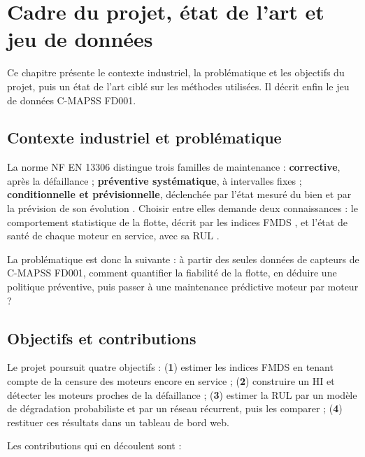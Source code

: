 \chapter{Cadre du projet, état de l'art et jeu de données}\label{sec:cadre}

\chapintro

Ce chapitre présente le contexte industriel, la problématique et les objectifs du projet, puis un état de l'art ciblé sur les méthodes utilisées. Il décrit enfin le jeu de données C-MAPSS FD001.

\section{Contexte industriel et problématique}\label{sec:contexte}

La norme NF EN 13306 \cite{nf13306} distingue trois familles de maintenance : \textbf{corrective}, après la défaillance ; \textbf{préventive systématique}, à intervalles fixes ; \textbf{conditionnelle et prévisionnelle}, déclenchée par l'état mesuré du bien et par la prévision de son évolution \cite{jardine2006}. Choisir entre elles demande deux connaissances : le comportement statistique de la flotte, décrit par les indices FMDS \cite{benhmida}, et l'état de santé de chaque moteur en service, avec sa RUL \cite{lei2018,si2011}.

La problématique est donc la suivante : à partir des seules données de capteurs de C-MAPSS FD001, comment quantifier la fiabilité de la flotte, en déduire une politique préventive, puis passer à une maintenance prédictive moteur par moteur ?

\section{Objectifs et contributions}\label{sec:objectifs}

Le projet poursuit quatre objectifs : (\textbf{1}) estimer les indices FMDS en tenant compte de la censure des moteurs encore en service ; (\textbf{2}) construire un HI et détecter les moteurs proches de la défaillance ; (\textbf{3}) estimer la RUL par un modèle de dégradation probabiliste et par un réseau récurrent, puis les comparer ; (\textbf{4}) restituer ces résultats dans un tableau de bord web.

Les contributions qui en découlent sont :

